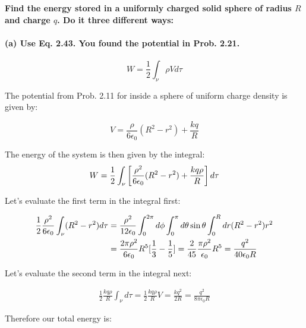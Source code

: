 \documentclass{article}
\numberwithin{equation}{section}
\numberwithin{figure}{section}
\begin{document}
\textbf{Find the energy stored in a uniformly charged solid sphere of radius $R$ and charge $q$. Do it three different ways:}

\paragraph{(a) Use Eq. 2.43. You found the potential in Prob. 2.21.}

\begin{equation*}
    W = \frac{1}{2} \int_\nu \rho V d \tau \tag{Eq. 2.43, Griffiths}
\end{equation*}

The potential from Prob. 2.11 for inside a sphere of uniform charge density is given by:

\begin{equation}
    V = \frac{\rho}{6 \epsilon_0} (R^2 - r^2) + \frac{kq}{R}
\end{equation}

The energy of the system is then given by the integral: 
\begin{equation}
     W = \frac{1}{2} \int_\nu \left[ {\rho^2 \over 6 \epsilon_0} (R^2 - r^2) +{kq\rho \over R} \right]d \tau
\end{equation}

Let's evaluate the first term in the integral first:

\begin{equation}
\begin{split}
     \frac{1}{2}{\rho^2 \over 6 \epsilon_0} \int_\nu (R^2 - r^2) d\tau &= {\rho^2 \over 12 \epsilon_0} \int_0^{2\pi} d \phi \int_0^\pi d \theta \sin \theta \int_0^R dr(R^2 - r^2)r^2 \\
     &= \frac{2\pi \rho^2}{6 \epsilon_0} R^5 \lbrack \frac{1}{3} - {1 \over 5} \rbrack = \frac{2}{45} \frac{\pi \rho^2}{\epsilon_0} R^5= \frac{q^2}{40 \epsilon_0 R}
\end{split}
\end{equation}

Let's evaluate the second term in the integral next:

\begin{equation}
    \begin{split}
        \frac{1}{2} \frac{kq \rho}{R} \int_\nu d \tau = \frac{1}{2} \frac{kq\rho}{R} V = \frac{kq^2}{2R} = \frac{q^2}{8 \pi \epsilon_0 R }
    \end{split}
\end{equation}

Therefore our total energy is:
\end{document}
